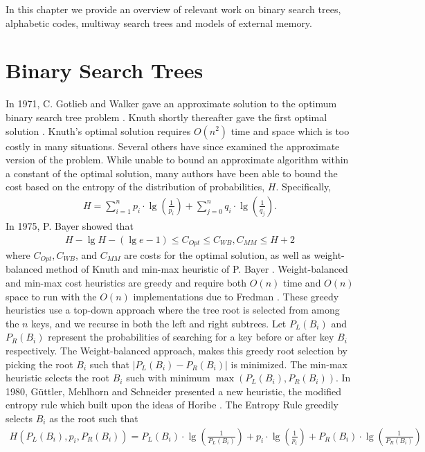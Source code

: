 \documentclass[letterpaper,12pt,titlepage,oneside,final]{book}
\theoremstyle{plain}
\begin{document}
In this chapter we provide an overview of relevant work on binary search trees, alphabetic codes, multiway search trees and models of external memory.

\section{Binary Search Trees}

In 1971, C. Gotlieb and Walker gave an approximate solution to the optimum binary search tree problem \cite{walker1971top}. Knuth shortly thereafter gave the first optimal solution \cite{knuth1971optimum}. Knuth's optimal solution requires $O(n^2)$ time and space which is too costly in many situations. Several others have since examined the approximate version of the problem. While unable to bound an approximate algorithm within a constant of the optimal solution, many authors have been able to bound the cost based on the entropy of the distribution of probabilities, $H$. Specifically, 
\begin{align*}
H = \sum_{i=1}^{n} p_i\cdot\lg(\frac{1}{p_i}) + \sum_{j=0}^{n} q_i\cdot\lg(\frac{1}{q_j}).
\end{align*}
In 1975, P. Bayer showed that 
\begin{align*}
H-\lg H-(\lg e-1) \leq C_{Opt} \leq C_{WB}, C_{MM} \leq H + 2
\end{align*}
where $C_{Opt}, C_{WB}$, and $C_{MM}$ are costs for the optimal solution, as well as weight-balanced method of Knuth \cite{knuth1971optimum} and min-max heuristic of P. Bayer \cite{bayer1975improved}. Weight-balanced and min-max cost heuristics are greedy and require both $O(n)$ time and $O(n)$ space to run with the $O(n)$ implementations due to Fredman \cite{fredman1975two}. These greedy heuristics use a top-down approach where the tree root is selected from among the $n$ keys, and we recurse in both the left and right subtrees. Let $P_L(B_i)$ and $P_R(B_i)$ represent the probabilities of searching for a key before or after key $B_i$ respectively. The Weight-balanced approach, makes this greedy root selection by picking the root $B_i$ such that $|P_L(B_i)-P_R(B_i)|$ is minimized. The min-max heuristic selects the root $B_i$ such with minimum $\max(P_L(B_i), P_R(B_i))$.
  In 1980, G{\"u}ttler, Mehlhorn and Schneider presented a new heuristic, the modified entropy rule \cite{guttler1980binary} which built upon the ideas of Horibe \cite{horibe1977improved}. The Entropy Rule greedily selects $B_i$ as the root such that
\begin{align*}
H(P_L(B_i), p_i, P_R(B_i)) = P_L(B_i)\cdot\lg(\frac{1}{P_L(B_i)}) + p_i \cdot \lg(\frac{1}{p_i}) + P_R(B_i)\cdot\lg(\frac{1}{P_R(B_i)})  
\end{align*}
\end{document}

